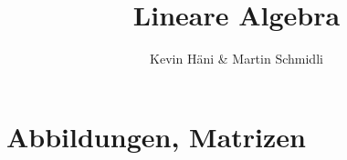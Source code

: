 \documentclass[a4paper,10pt]{report}
\begin{document}
\pagestyle{empty} %

\title{Lineare Algebra}
\author{Kevin Häni \& Martin Schmidli}
\maketitle


\tableofcontents %
\cleardoublepage %

\pagestyle{plain} %



\chapter{Abbildungen, Matrizen}
\end{document}
